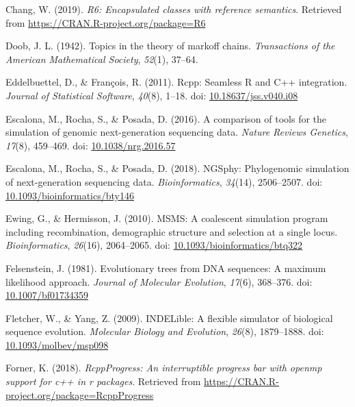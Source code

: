 \documentclass[12pt,]{article}
\begin{document}
\leavevmode\hypertarget{ref-Chang_2019}{}%
Chang, W. (2019). \emph{R6: Encapsulated classes with reference semantics}. Retrieved from \url{https://CRAN.R-project.org/package=R6}

\leavevmode\hypertarget{ref-Doob_1942}{}%
Doob, J. L. (1942). Topics in the theory of markoff chains. \emph{Transactions of the American Mathematical Society}, \emph{52}(1), 37--64.

\leavevmode\hypertarget{ref-Eddelbuettel_2011}{}%
Eddelbuettel, D., \& François, R. (2011). Rcpp: Seamless R and C++ integration. \emph{Journal of Statistical Software}, \emph{40}(8), 1--18. doi: \href{https://doi.org/10.18637/jss.v040.i08}{10.18637/jss.v040.i08}

\leavevmode\hypertarget{ref-Escalona_2016}{}%
Escalona, M., Rocha, S., \& Posada, D. (2016). A comparison of tools for the simulation of genomic next-generation sequencing data. \emph{Nature Reviews Genetics}, \emph{17}(8), 459--469. doi: \href{https://doi.org/10.1038/nrg.2016.57}{10.1038/nrg.2016.57}

\leavevmode\hypertarget{ref-Escalona_2018}{}%
Escalona, M., Rocha, S., \& Posada, D. (2018). NGSphy: Phylogenomic simulation of next-generation sequencing data. \emph{Bioinformatics}, \emph{34}(14), 2506--2507. doi: \href{https://doi.org/10.1093/bioinformatics/bty146}{10.1093/bioinformatics/bty146}

\leavevmode\hypertarget{ref-Ewing_2010}{}%
Ewing, G., \& Hermisson, J. (2010). MSMS: A coalescent simulation program including recombination, demographic structure and selection at a single locus. \emph{Bioinformatics}, \emph{26}(16), 2064--2065. doi: \href{https://doi.org/10.1093/bioinformatics/btq322}{10.1093/bioinformatics/btq322}

\leavevmode\hypertarget{ref-Felsenstein_1981}{}%
Felsenstein, J. (1981). Evolutionary trees from DNA sequences: A maximum likelihood approach. \emph{Journal of Molecular Evolution}, \emph{17}(6), 368--376. doi: \href{https://doi.org/10.1007/bf01734359}{10.1007/bf01734359}

\leavevmode\hypertarget{ref-Fletcher_2009}{}%
Fletcher, W., \& Yang, Z. (2009). INDELible: A flexible simulator of biological sequence evolution. \emph{Molecular Biology and Evolution}, \emph{26}(8), 1879--1888. doi: \href{https://doi.org/10.1093/molbev/msp098}{10.1093/molbev/msp098}

\leavevmode\hypertarget{ref-Forner_2018}{}%
Forner, K. (2018). \emph{RcppProgress: An interruptible progress bar with openmp support for c++ in r packages}. Retrieved from \url{https://CRAN.R-project.org/package=RcppProgress}
\end{document}
